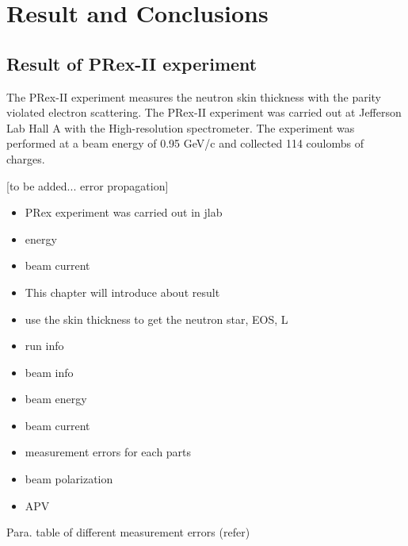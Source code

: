 \chapter{Result and Conclusions}

\section{Result of PRex-II experiment}

The PRex-II experiment measures the neutron skin thickness with the parity violated electron scattering. The PRex-II experiment was carried out at Jefferson Lab Hall A with the High-resolution spectrometer. The experiment was performed at a beam energy of 0.95 GeV/c and collected 114 coulombs of charges. 

[to be added... error propagation]




\begin{itemize}
    \item PRex experiment was carried out in jlab 
    \item energy 
    \item  beam current 
    \item  This chapter will introduce about result 
    \item use the skin thickness to get the neutron star, EOS, L 
\end{itemize}

\begin{itemize}
    \item run info
    \item beam info
    \item beam energy 
    \item beam current 
\end{itemize}


\begin{itemize}
    \item measurement errors for each parts
    \item beam polarization 
    \item APV
\end{itemize}

Para. table of different measurement errors (refer)

